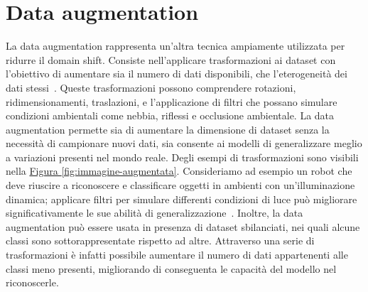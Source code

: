 \documentclass[12pt]{report}
\begin{document}
\section{Data augmentation}
\label{sec:augmentation}

La data augmentation rappresenta un'altra tecnica ampiamente utilizzata per ridurre il domain shift. Consiste nell'applicare trasformazioni ai dataset con l'obiettivo di aumentare sia il numero di dati disponibili, che l'eterogeneità dei dati stessi~\cite{Shorten2019}. Queste trasformazioni possono comprendere rotazioni, ridimensionamenti, traslazioni, e l'applicazione di filtri che possano simulare condizioni ambientali come nebbia, riflessi e occlusione ambientale. La data augmentation permette sia di aumentare la dimensione di dataset senza la necessità di campionare nuovi dati, sia consente ai modelli di generalizzare meglio a variazioni presenti nel mondo reale. Degli esempi di trasformazioni sono visibili nella \hyperref[fig:immagine-augmentata]{Figura \ref{fig:immagine-augmentata}}. Consideriamo ad esempio un robot che deve riuscire a riconoscere e classificare oggetti in ambienti con un'illuminazione dinamica; applicare filtri per simulare differenti condizioni di luce può migliorare significativamente le sue abilità di generalizzazione~\cite{NEURIPS2021_fb4c4860}. Inoltre, la data augmentation può essere usata in presenza di dataset sbilanciati, nei quali alcune classi sono sottorappresentate rispetto ad altre. Attraverso una serie di trasformazioni è infatti possibile aumentare il numero di dati appartenenti alle classi meno presenti, migliorando di conseguenta le capacità del modello nel riconoscerle.
\end{document}
